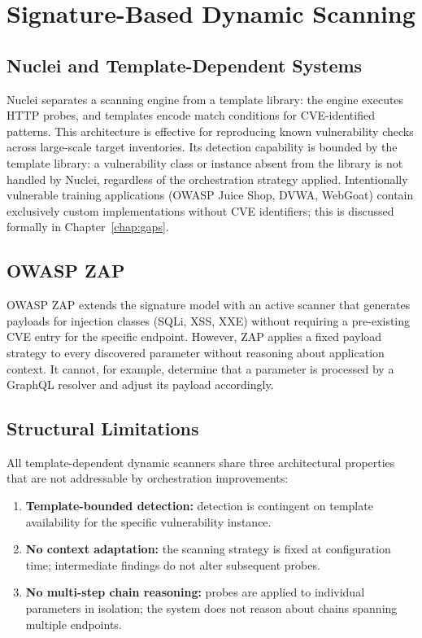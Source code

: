 \documentclass[12pt, a4paper, oneside, openany]{book}
\begin{document}
\section{Signature-Based Dynamic Scanning}
\label{sec:signature}

\subsection{Nuclei and Template-Dependent Systems}

Nuclei \citep{projectdiscovery_nuclei} separates a scanning engine
from a template library: the engine executes HTTP probes, and templates
encode match conditions for CVE-identified patterns.  This architecture
is effective for reproducing known vulnerability checks across
large-scale target inventories.  Its detection capability is bounded
by the template library: a vulnerability class or instance absent from
the library is not handled by Nuclei, regardless of the orchestration
strategy applied.  Intentionally vulnerable training applications
(OWASP Juice Shop, DVWA, WebGoat) contain exclusively custom
implementations without CVE identifiers; this is discussed formally
in Chapter~\ref{chap:gaps}.

\subsection{OWASP ZAP}

OWASP ZAP \citep{owaspzap2024} extends the signature model with an
active scanner that generates payloads for injection classes (SQLi,
XSS, XXE) without requiring a pre-existing CVE entry for the specific
endpoint.  However, ZAP applies a fixed payload strategy to every
discovered parameter without reasoning about application context.
It cannot, for example, determine that a parameter is processed by a
GraphQL resolver and adjust its payload accordingly.

\subsection{Structural Limitations}

All template-dependent dynamic scanners share three architectural
properties that are not addressable by orchestration improvements:

\begin{enumerate}[leftmargin=*]
  \item \textbf{Template-bounded detection:} detection is contingent
    on template availability for the specific vulnerability instance.
  \item \textbf{No context adaptation:} the scanning strategy is fixed
    at configuration time; intermediate findings do not alter subsequent
    probes.
  \item \textbf{No multi-step chain reasoning:} probes are applied to
    individual parameters in isolation; the system does not reason about
    chains spanning multiple endpoints.
\end{enumerate}
\end{document}
